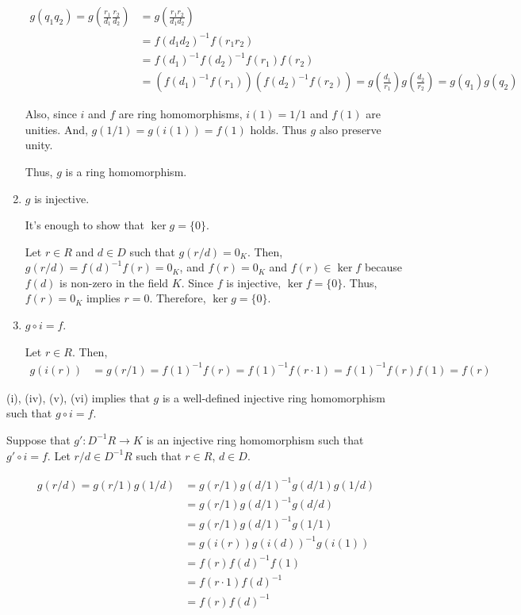 \documentclass{article}
\begin{document}
\begin{enumerate}[label=(\roman*)]
  \begin{align*}
    g(q_1 q_2)
    = g(\frac{r_1}{d_1} \frac{r_2}{d_2})
    &= g(\frac{r_1 r_2}{d_1 d_2})
    \\&= f(d_1 d_2)^{-1} f(r_1 r_2)
    \\&= f(d_1)^{-1} f(d_2)^{-1} f(r_1) f(r_2)
    \\&= (f(d_1)^{-1} f(r_1)) (f(d_2)^{-1} f(r_2))
    = g(\frac{d_1}{r_1}) g(\frac{d_2}{r_2})
    = g(q_1) g(q_2)
  \end{align*}

  Also, since \(i\) and \(f\) are ring homomorphisms, \(i(1) = 1/1\) and \(f(1)\) are unities. And, \(g(1 / 1) = g(i(1)) = f(1)\) holds. Thus \(g\) also preserve unity.

  Thus, \(g\) is a ring homomorphism.

\item \(g\) is injective.

  It's enough to show that \(\ker g = \{0\}\).

  Let \(r \in R\) and \(d \in D\) such that \(g(r / d) = 0_K\).
  Then, \(g(r/d) = f(d)^{-1} f(r) = 0_K\),
  and \(f(r) = 0_K\) and \(f(r) \in \ker f\) because \(f(d)\) is non-zero in the field \(K\).
  Since \(f\) is injective, \(\ker f = \{0\}\).
  Thus, \(f(r) = 0_K\) implies \(r = 0\).
  Therefore, \(\ker g = \{0\}\).

\item \(g \circ i = f\).

  Let \(r \in R\). Then,
  \begin{align*}
    g(i(r)) &= g(r / 1) = f(1)^{-1} f(r) = f(1)^{-1} f(r \cdot 1) = f(1)^{-1} f(r) f(1) = f(r)
  \end{align*}

\end{enumerate}

(i), (iv), (v), (vi) implies that \(g\) is a well-defined injective ring homomorphism such that \(g \circ i = f\).
\newline

\noindent
Suppose that \(g': D^{-1}R \to K\) is an injective ring homomorphism such that \(g' \circ i = f\).
Let \(r/d \in D^{-1}R\) such that \(r \in R\), \(d \in D\).

\begin{align*}
  g(r/d) = g(r/1) g(1/d)
  &= g(r/1) g(d/1)^{-1} g(d/1) g(1/d)
  \\&= g(r/1) g(d/1)^{-1} g(d/d)
  \\&= g(r/1) g(d/1)^{-1} g(1/1)
  \\&= g(i(r)) g(i(d))^{-1} g(i(1))
  \\&= f(r) f(d)^{-1} f(1)
  \\&= f(r \cdot 1) f(d)^{-1}
  \\&= f(r) f(d)^{-1}
\end{align*}
\end{document}
